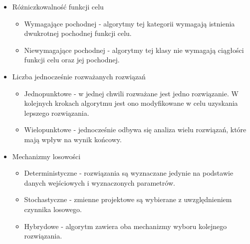 \begin{itemize}[noitemsep]
	\item Różniczkowalność funkcji celu
	\begin{itemize}[noitemsep]
		\item Wymagające pochodnej - algorytmy tej kategorii wymagają istnienia dwukrotnej pochodnej funkcji celu.
		\item Niewymagające pochodnej - algorytmy tej klasy nie wymagają ciągłości funkcji celu oraz jej pochodnej.
	\end{itemize}
	\item Liczba jednocześnie rozważanych rozwiązań
	\begin{itemize}[noitemsep]
		\item Jednopunktowe - w jednej chwili rozważane jest jedno rozwiązanie. W kolejnych krokach algorytmu jest ono modyfikowane w celu uzyskania lepszego rozwiązania.
		\item Wielopunktowe - jednocześnie odbywa się analiza wielu rozwiązań, które mają wpływ na wynik końcowy.
	\end{itemize}
	\item Mechanizmy losowości
	\begin{itemize}[noitemsep]
		\item Deterministyczne - rozwiązania są wyznaczane jedynie na podstawie danych wejściowych i wyznaczonych parametrów.
		\item Stochastyczne - zmienne projektowe są wybierane z uwzględnieniem czynnika losowego.
		\item Hybrydowe - algorytm zawiera oba mechanizmy wyboru kolejnego rozwiązania.
	\end{itemize}
\end{itemize}

